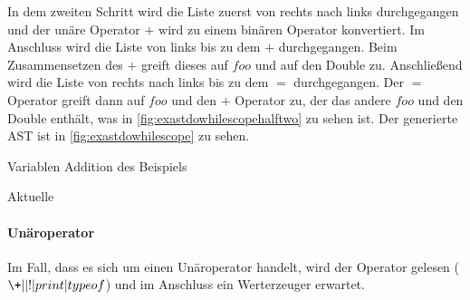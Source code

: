 {{        In dem zweiten Schritt wird die Liste zuerst von rechts nach links durchgegangen und der unäre Operator \myMIn$+$ wird zu einem binären Operator konvertiert. Im Anschluss  wird die Liste von links bis zu dem \myMIn$+$ durchgegangen. Beim Zusammensetzen des \myMIn$+$ greift dieses auf \myMIn$foo$ und auf den Double zu. Anschließend wird die Liste von rechts nach links bis zu dem \myMIn$=$ durchgegangen. Der \myMIn$=$ Operator greift dann auf \myMIn$foo$ und den \myMIn$+$ Operator zu, der das andere \myMIn$foo$ und den Double enthält, was in \autoref{fig:exastdowhilescopehalftwo} zu sehen ist. Der generierte AST ist in \autoref{fig:exastdowhilescope} zu sehen.
        \begin{paracol}{2}
          \begin{myCodeEnv}
            \centering
            \begin{myInvBox}[width=.9\linewidth]
              
            \end{myInvBox}
            \caption{Variablen Addition des Beispiels}
            \label{fig:exastdowhilescope}
          \end{myCodeEnv}
          \switchcolumn
          \begin{myCodeEnv}
            \centering
            \begin{myInvBox}[width=.9\linewidth]
              
            \end{myInvBox}
            \caption*{Aktuelle }
          \end{myCodeEnv}
        \end{paracol}

      \paragraph{Unäroperator}
        Im Fall, dass es sich um einen Unäroperator handelt, wird der Operator gelesen (\myRIn$\+|\-|!|print|typeof$) und im Anschluss ein Werterzeuger erwartet.

}}
